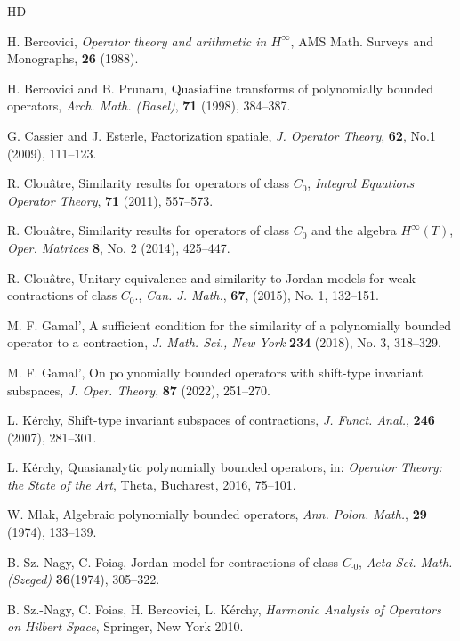 \documentclass[a4paper,oneside,11pt]{amsart}
\numberwithin{equation}{section}
\theoremstyle{plain}
\theoremstyle{definition}
\begin{document}
\begin{thebibliography}{HD}


\normalsize
\baselineskip=11pt

 H. Bercovici, \emph{Operator theory and arithmetic in $H^\infty$},
   AMS Math. Surveys and Monographs, {\bf 26} (1988).  

  H. Bercovici  and B. Prunaru, 
Quasiaffine transforms of polynomially bounded operators,
\emph{Arch. Math. (Basel)}, {\bf 71} (1998),  384--387.

 G. Cassier and J. Esterle, Factorization spatiale, \emph{J. Operator Theory}, {\bf 62}, No.1 (2009), 111--123.

 R. Clou\^atre, Similarity results for operators of class $C_0$, \emph{Integral Equations Operator Theory}, {\bf 71} (2011), 557--573. 

 R. Clou\^atre, Similarity results for operators of class $C_0$ and the algebra $H^\infty(T)$, 
\emph{Oper. Matrices} {\bf 8}, No. 2 (2014), 425--447.

 R. Clou\^atre, 
Unitary equivalence and similarity to Jordan models for weak contractions of class $C_0$., \emph{Can. J. Math.}, 
{\bf 67}, (2015),  No. 1, 132--151. 

 M. F. Gamal',  A sufficient condition for the similarity of a polynomially
 bounded operator to a contraction, \emph{J. Math. Sci., New York} {\bf 234} (2018), No. 3, 318--329.  

   M. F.  Gamal',  On polynomially bounded operators with shift-type invariant subspaces, 
\emph{J. Oper. Theory}, {\bf 87} (2022), 251--270. 

 L. K\'erchy, Shift-type invariant subspaces of contractions, 
 \emph{J. Funct. Anal.}, {\bf 246} (2007), 281--301.


  L. K\'erchy, Quasianalytic polynomially bounded operators,
in:  \emph{Operator Theory: the State of the Art}, Theta, Bucharest, 2016, 75--101.


 W. Mlak, Algebraic polynomially bounded operators, 
  \emph{Ann. Polon. Math.}, {\bf 29} (1974), 133--139.
   
 B. Sz.-Nagy, C. Foia\c s, Jordan model for contractions of class $C_{\cdot 0}$, 
\emph{Acta Sci. Math. (Szeged)} {\bf 36}(1974), 305--322.

 B. Sz.-Nagy,  C. Foias, H. Bercovici, L. K\'erchy, 
\emph{Harmonic Analysis of Operators on Hilbert Space}, 
 Springer, New York 2010. 


\end{thebibliography}
\end{document}
